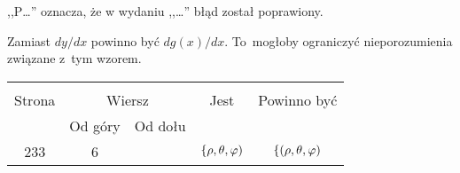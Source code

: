 \documentclass[a4paper,11pt]{article}
\begin{document}









,,P\ldots'' oznacza, że w wydaniu ,,\ldots'' błąd został poprawiony.\\







\start {} Zamiast $dy/dx$ powinno być $d g( x )/dx$.
To~mogłoby ograniczyć nieporozumienia związane z~tym wzorem.

\vspace{\spaceFour}


\begin{center}
  \begin{tabular}{|c|c|c|c|c|}
    \hline
    & \multicolumn{2}{c|}{} & & \\
    Strona & \multicolumn{2}{c|}{Wiersz} & Jest
                              & Powinno być \\ \cline{2-3}
    & Od góry & Od dołu & & \\
    \hline
    233 &  6 & & $\{\rho, \theta, \varphi)$ & $\{ ( \rho, \theta, \varphi )$ \\
    \hline
  \end{tabular}
\end{center}

\vspace{\spaceTwo}
\end{document}
